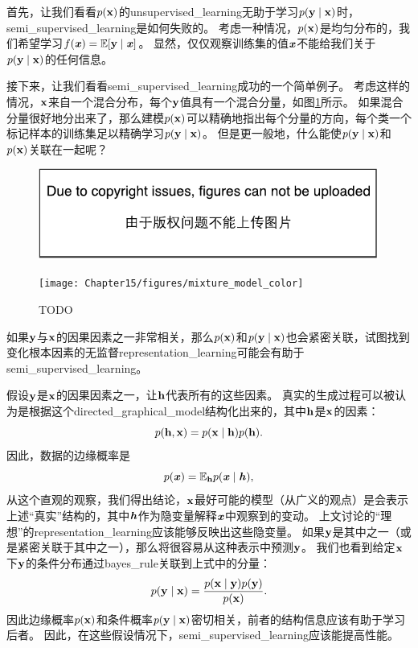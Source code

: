 首先，让我们看看$p(\mathbf{x})$的\gls{unsupervised_learning}无助于学习$p(\mathbf{y}\mid\mathbf{x})$时，\gls{semi_supervised_learning}是如何失败的。
考虑一种情况，$p(\mathbf{x})$是均匀分布的，我们希望学习$f(\boldsymbol{\mathit{x}}) = \mathbb{E}[\mathbf{y} \mid \boldsymbol{\mathit{x}}]$。
显然，仅仅观察训练集的值$\boldsymbol{\mathit{x}}$不能给我们关于$p(\mathbf{y} \mid \mathbf{x})$的任何信息。


接下来，让我们看看\gls{semi_supervised_learning}成功的一个简单例子。
考虑这样的情况，$\mathbf{x}$来自一个混合分布，每个$\mathbf{y}$值具有一个混合分量，如图\ref{fig:chap15_mixture_model}所示。
如果混合分量很好地分出来了，那么建模$p(\mathbf{x})$可以精确地指出每个分量的方向，每个类一个标记样本的训练集足以精确学习$p(\mathbf{y} \mid \mathbf{x})$。
但是更一般地，什么能使$p(\mathbf{y} \mid \mathbf{x})$和$p(\mathbf{x})$关联在一起呢？

\begin{figure}[!htb]
\ifOpenSource
\centerline{\includegraphics{figure.pdf}}
\else
\centerline{\texttt{[image: Chapter15/figures/mixture\_model\_color]}}
\fi
\caption{TODO}
\label{fig:chap15_mixture_model}
\end{figure}

如果$\mathbf{y}$与$\mathbf{x}$的因果因素之一非常相关，那么$p(\mathbf{x})$和$p(\mathbf{y} \mid \mathbf{x})$也会紧密关联，试图找到变化根本因素的无监督\gls{representation_learning}可能会有助于\gls{semi_supervised_learning}。


假设$\mathbf{y}$是$\mathbf{x}$的因果因素之一，让$\mathbf{h}$代表所有的这些因素。
真实的生成过程可以被认为是根据这个\gls{directed_graphical_model}结构化出来的，其中$\mathbf{h}$是$\mathbf{x}$的因素：
\begin{equation}
	p(\mathbf{h}, \mathbf{x}) = p(\mathbf{x} \mid \mathbf{h}) p(\mathbf{h}).
\end{equation}
因此，数据的边缘概率是
\begin{equation}
	p(\boldsymbol{\mathit{x}}) = \mathbb{E}_{\mathbf{h}} p(\boldsymbol{\mathit{x}} \mid \boldsymbol{\mathit{h}}),
\end{equation}
从这个直观的观察，我们得出结论，$\mathbf{x}$最好可能的模型（从广义的观点）是会表示上述``真实''结构的，其中$\boldsymbol{\mathit{h}}$作为隐变量解释$\boldsymbol{\mathit{x}}$中观察到的变动。
上文讨论的``理想''的\gls{representation_learning}应该能够反映出这些隐变量。
如果$\mathbf{y}$是其中之一（或是紧密关联于其中之一），那么将很容易从这种表示中预测$\mathbf{y}$。
我们也看到给定$\mathbf{x}$下$\mathbf{y}$的条件分布通过\gls{bayes_rule}关联到上式中的分量：
\begin{equation}
	p(\mathbf{y} \mid \mathbf{x}) = \frac{ p(\mathbf{x} \mid \mathbf{y}) p(\mathbf{y}) }{p(\mathbf{x})}.
\end{equation}
因此边缘概率$p(\mathbf{x})$和条件概率$p(\mathbf{y} \mid \mathbf{x})$密切相关，前者的结构信息应该有助于学习后者。
因此，在这些假设情况下，\gls{semi_supervised_learning}应该能提高性能。


